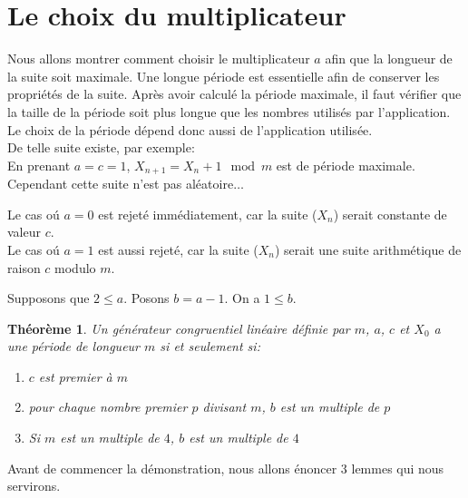 \documentclass[a4paper,11pt]{report}
\newtheorem{theo}{Th\'eor\`eme}[section]
\begin{document}
	
	\section{Le choix du multiplicateur}
	Nous allons montrer comment choisir le multiplicateur $a$ afin que la longueur de la %
	suite soit maximale. Une longue p\'eriode est essentielle afin de conserver les propri\'et\'es %
	de la suite. Apr\`es avoir calcul\'e la p\'eriode maximale, il faut v\'erifier que la taille de la %
	 p\'eriode soit plus longue que les nombres utilis\'es par l'application. %
	Le choix de la p\'eriode d\'epend donc aussi de l'application utilis\'ee.\\
	De telle suite existe, par exemple:\\
	En prenant $a=c=1$, $X_{n+1}= X_{n}+1 \mod{m}$ est de p\'eriode maximale. Cependant cette %
	suite n'est pas al\'eatoire$\ldots$
	 
	 
	Le cas o\'u $a=0$ est rejet\'e imm\'ediatement, car la suite ($X_{n}$) serait constante de %
	valeur $c$.\\
	Le cas o\'u $a=1$ est aussi rejet\'e, car la suite ($X_{n}$) serait une suite arithm\'etique %
	de raison $c$ modulo $m$. 
	
	Supposons que $2\leq a$. Posons $b=a-1$. On a $1\leq b$.\\
	
	\begin{theo}\label{theo1}
	Un g\'en\'erateur congruentiel lin\'eaire d\'efinie par $m$, $a$, $c$ et $X_{0}$ a une p\'eriode %
	de longueur $m$ si et seulement si:\\
	\begin{enumerate}
	\item $c$ est premier \`a $m$
	\item pour chaque nombre premier $p$ divisant $m$, $b$ est un multiple de $p$
	\item Si $m$ est un multiple de $4$, $b$ est un multiple de $4$\\
	\end{enumerate}
	\end{theo}
	
	Avant de commencer la d\'emonstration, nous allons \'enoncer $3$ lemmes qui nous servirons.\\
	
\end{document}
